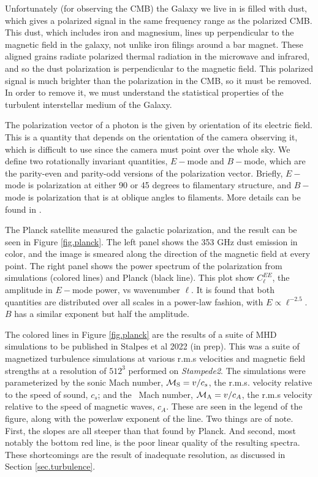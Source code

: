 Unfortunately (for observing the CMB) the Galaxy we live in is filled with dust,
which gives a polarized signal in the same frequency range as the polarized CMB.
This dust, which includes iron and magnesium, lines up perpendicular to the magnetic
field in the galaxy, not unlike iron filings around a bar magnet.  These aligned
grains radiate polarized thermal radiation in the microwave and infrared, and so
the dust polarization is perpendicular to the magnetic field.  This
polarized signal is much brighter than the polarization in the CMB, so it must be
removed.  In order to remove it, we must understand the statistical properties
of the turbulent interstellar medium of the Galaxy. 

The polarization vector of a photon is the given by orientation of its electric field.  This is
a quantity that depends on the orientation of the camera observing it, which is
difficult to use since the camera must point over the whole sky.  We define two
rotationally invariant quantities, $E-$mode and $B-$mode, which are the
parity-even and parity-odd versions of the polarization vector.  Briefly,
$E-$mode is polarization at either 90 or 45 degrees to filamentary structure,
and $B-$mode is polarization that is at oblique angles to filaments.  More
details can be found in \citet{Rotti19}.  

The Planck satellite \citep{PlanckXIX15} measured the galactic polarization, and the result can be
seen in Figure \ref{fig.planck}.  The left panel shows the 353 GHz dust emission in color,
and the image is smeared along the direction of the magnetic field at every
point.  The right panel shows the power spectrum of the polarization from
simulations (colored lines) and Planck (black line).   This plot show
$C_\ell^{EE}$, the amplitude in $E-$mode power, vs wavenumber $\ell$.
It is found \citep{PlanckXIX15} that both quantities are
distributed over all scales in a power-law fashion, with $E \propto
\ell^{-2.5}$.
$B$ has a similar exponent but half the
amplitude.  

The colored lines in Figure \ref{fig.planck} are the results of a suite of MHD
simulations to be published in Stalpes et al 2022 (in prep).  This was a suite
of magnetized turbulence simulations at various r.m.s velocities and magnetic
field strengths at a resolution of $512^3$ performed on \emph{Stampede2}.  The
simulations were parameterized by the sonic Mach number, $\mathcal{M_{\rm{S}}}=v/c_s$, the r.m.s.
velocity relative to the speed of sound, $c_s$; and the \alf\ Mach number,
$\mathcal{M_{\rm{A}}}=v/c_A$, the
r.m.s velocity relative to the speed of magnetic waves, $c_A$.  These are seen
in the legend of the figure, along with the powerlaw exponent of the line.  Two things are
of note.  First, the slopes are all steeper than that found by Planck.  And
second, most notably the bottom red line, is the poor linear quality of the
resulting spectra.  These shortcomings are the result of inadequate resolution,
as discussed in Section \ref{sec.turbulence}.


